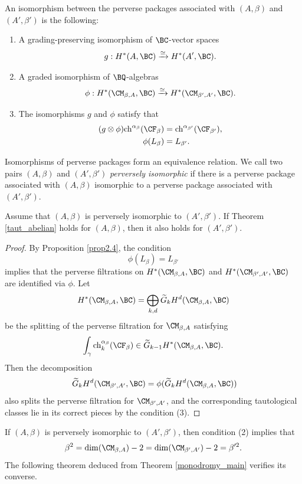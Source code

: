 An isomorphism between the perverse packages associated with $(A, \beta)$ and $(A', \beta')$ is the following:
\begin{enumerate}
    \item[(1)] A grading-preserving isomorphism of $\BC$-vector spaces
    \[
    g: H^*(A, \BC) \xrightarrow{\simeq} H^*(A', \BC).
    \]
    \item[(2)] A graded isomorphism of $\BQ$-algebras
    \[
    \phi: H^*(\CM_{\beta,A}, \BC) \xrightarrow{\simeq} H^*(\CM_{\beta',A'}, \BC).
    \]
    \item[(3)] The isomorphisms $g$ and $\phi$ satisfy that
    \[
    \begin{split}
        (g\otimes \phi) \mathrm{ch}^{\alpha_\beta} (\CF_\beta) & = \mathrm{ch}^{\alpha_{\beta'}}(\CF_{\beta'}),\\
        \phi(L_\beta) & = L_{\beta'}.
    \end{split}
    \]
\end{enumerate}
Isomorphisms of perverse packages form an equivalence relation. We call two pairs $(A, \beta)$ and $(A', \beta')$ \emph{perversely isomorphic} if there is a perverse package associated with $(A,\beta)$ isomorphic to a perverse package associated with $(A', \beta')$.

\begin{prop}
\notready\label{prop2.5}
Assume that $(A, \beta)$ is perversely isomorphic to $(A', \beta')$. If Theorem \ref{taut_abelian} holds for $(A, \beta)$, then it also holds for $(A', \beta')$.
\end{prop}

\begin{proof}
By Proposition \ref{prop2.4}, the condition
\[
\phi(L_\beta) = L_{\beta'}
\]
implies that the perverse filtrations on $H^*(\CM_{\beta,A}, \BC)$ and $H^*(\CM_{\beta', A'}, \BC)$ are identified via $\phi$. Let
\[
H^*(\CM_{\beta,A}, \BC) = \bigoplus_{k,d} \widetilde{G}_k H^d(\CM_{\beta,A}, \BC)
\]
be the splitting of the perverse filtration for $\CM_{\beta, A}$ satisfying
\[
\int_\gamma \mathrm{ch}^{\alpha_\beta}_k(\CF_\beta) \in \widetilde{G}_{k-1}H^*(\CM_{\beta,A}, \BC).
\]
Then the decomposition
\[
\
\widetilde{G}_k H^d(\CM_{\beta',A'}, \BC) = \phi(\widetilde{G}_k H^d(\CM_{\beta,A}, \BC))
\]
also splits the perverse filtration for $\CM_{\beta',A'}$, and the corresponding tautological classes lie in its correct pieces by the condition (3).
\end{proof}

If $(A, \beta)$ is perversely isomorphic to $(A', \beta')$, then condition (2) implies that
\[
\beta^2 = \mathrm{dim}(\CM_{\beta,A}) -2 = \mathrm{dim}(\CM_{\beta',A'}) -2 = \beta'^2.
\]
The following theorem deduced from Theorem \ref{monodromy_main} verifies its converse.

